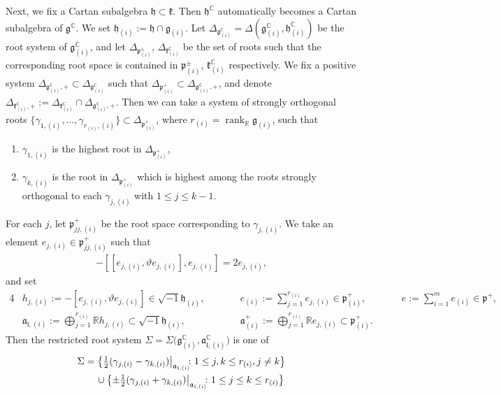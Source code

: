 \documentclass[11pt]{article}
\numberwithin{equation}{section}
\newcommand{\BR}{\mathbb{R}}
\newcommand{\BC}{\mathbb{C}}
\newcommand{\fa}{\mathfrak{a}}
\newcommand{\fg}{\mathfrak{g}}
\newcommand{\fh}{\mathfrak{h}}
\newcommand{\fk}{\mathfrak{k}}
\newcommand{\fl}{\mathfrak{l}}
\newcommand{\fp}{\mathfrak{p}}
\newcommand{\rank}{\operatorname{rank}}
\begin{document}
Next, we fix a Cartan subalgebra $\fh\subset\fk$. Then $\fh^\BC$ automatically becomes a Cartan subalgebra of $\fg^\BC$.
We set $\fh_{(i)}:=\fh\cap\fg_{(i)}$.
Let $\Delta_{\fg^\BC_{(i)}}=\Delta(\fg^\BC_{(i)},\fh^{\BC}_{(i)})$ be the root system of $\fg^\BC_{(i)}$,
and let $\Delta_{\fp^\pm_{(i)}}$, $\Delta_{\fk^\BC_{(i)}}$ be the set of roots
such that the corresponding root space is contained in $\fp^\pm_{(i)}$, $\fk^\BC_{(i)}$ respectively.
We fix a positive system $\Delta_{\fg^\BC_{(i)},+}\subset \Delta_{\fg^\BC_{(i)}}$
such that $\Delta_{\fp^+_{(i)}}\subset\Delta_{\fg^\BC_{(i)},+}$,
and denote $\Delta_{\fk^\BC_{(i)},+}:=\Delta_{\fk^\BC_{(i)}}\cap \Delta_{\fg^\BC_{(i)},+}$.
Then we can take a system of strongly orthogonal roots
$\{\gamma_{1,(i)},\ldots,\gamma_{r_{(i)},(i)}\}\subset \Delta_{\fp^+_{(i)}}$,
where $r_{(i)}=\rank_\BR\fg_{(i)}$, such that
\begin{enumerate}\itemsep=0pt
\item $\gamma_{1,(i)}$ is the highest root in $\Delta_{\fp^+_{(i)}}$,
\item $\gamma_{k,(i)}$ is the root in $\Delta_{\fp^+_{(i)}}$
which is highest among the roots strongly orthogonal to each $\gamma_{j,(i)}$ with $1\le j\le k-1$.
\end{enumerate}
For each $j$, let $\fp^+_{jj,(i)}$ be the root space corresponding to $\gamma_{j,(i)}$.
We take an element $e_{j,(i)}\in\fp^+_{jj,(i)}$ such that
\begin{gather*} -[[e_{j,(i)},\vartheta e_{j,(i)}],e_{j,(i)}]=2e_{j,(i)}, \end{gather*}
and set
\begin{alignat*}{4}
& h_{j,(i)}:=-[e_{j,(i)},\vartheta e_{j,(i)}]\in\sqrt{-1}\fh_{(i)},\qquad && e_{(i)}:=\sum_{j=1}^{r_{(i)}}e_{j,(i)}\in\fp^+_{(i)},\qquad && e:=\sum_{i=1}^m e_{(i)}\in\fp^+,& \\
&\fa_{\fl,(i)}:=\bigoplus_{j=1}^{r_{(i)}}\BR h_{j,(i)}\subset\sqrt{-1}\fh_{(i)},\qquad && \fa_{(i)}^+:=\bigoplus_{j=1}^{r_{(i)}}\BR e_{j,(i)}\subset\fp^+_{(i)}.&&&
\end{alignat*}
Then the restricted root system $\Sigma=\Sigma\big(\fg^\BC_{(i)},\fa_{\fl,(i)}^\BC\big)$ is one of
\begin{gather*} \Sigma=\big\{ \tfrac{1}{2}(\gamma_{j,(i)}-\gamma_{k,(i)})\big|_{\fa_{\fl,(i)}}\!\!\colon
 1\le j, k\le r_{(i)}, j\ne k \big\}\\
 \hphantom{\Sigma=}{}
\cup\big\{{\pm}\tfrac{1}{2}(\gamma_{j,(i)}+\gamma_{k,(i)})\big|_{\fa_{\fl,(i)}}\!\!\colon 1\le j\le k\le r_{(i)}\big\} \end{gather*}
\end{document}
